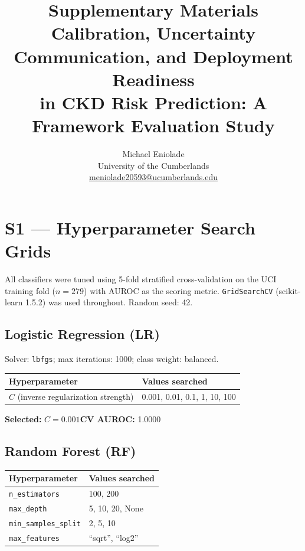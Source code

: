 \documentclass[11pt]{article}
\title{Supplementary Materials\\
\large Calibration, Uncertainty Communication, and Deployment Readiness\\
in CKD Risk Prediction: A Framework Evaluation Study}
\author{Michael Eniolade\\
        \small University of the Cumberlands\\
        \small \href{mailto:meniolade20593@ucumberlands.edu}{meniolade20593@ucumberlands.edu}}
\date{}
\begin{document}
\maketitle

\tableofcontents
\clearpage

\section*{S1 — Hyperparameter Search Grids}

All classifiers were tuned using 5-fold stratified cross-validation on the
UCI training fold ($n = 279$) with AUROC as the scoring metric.
\texttt{GridSearchCV} (scikit-learn 1.5.2) was used throughout.
Random seed: 42.

\subsection*{Logistic Regression (LR)}

Solver: \texttt{lbfgs}; max iterations: 1000; class weight: balanced.

\begin{center}
\begin{tabular}{ll}
\toprule
Hyperparameter & Values searched \\
\midrule
$C$ (inverse regularization strength) & 0.001, 0.01, 0.1, 1, 10, 100 \\
\bottomrule
\end{tabular}
\end{center}

\noindent\textbf{Selected:} $C = 0.001$\quad\textbf{CV AUROC:} 1.0000

\subsection*{Random Forest (RF)}

\begin{center}
\begin{tabular}{ll}
\toprule
Hyperparameter & Values searched \\
\midrule
\texttt{n\_estimators}    & 100, 200 \\
\texttt{max\_depth}       & 5, 10, 20, None \\
\texttt{min\_samples\_split} & 2, 5, 10 \\
\texttt{max\_features}    & ``sqrt'', ``log2'' \\
\bottomrule
\end{tabular}
\end{center}
\end{document}
